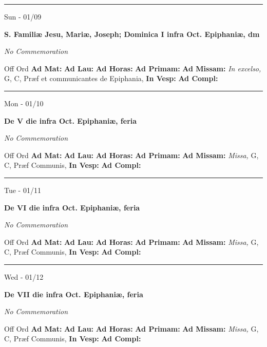 \documentclass[letterpaper, 10pt]{article}
\begin{document}
\hrule
\begin{center}
Sun - 01/09
\end{center}\textbf{ \large S. Familiæ Jesu, Mariæ, Joseph; Dominica I infra Oct. Epiphaniæ, \textnormal{\normalsize dm}}

\textit{No Commemoration}\begin{justify}
Off Ord
\textbf{Ad Mat: }
\textbf{Ad Lau: }
\textbf{Ad Horas: }
\textbf{Ad Primam: }
\textbf{Ad Missam:} \textit{In excelso, } G, C, Præf et communicantes de Epiphania, 
\textbf{In Vesp: }
\textbf{Ad Compl: }\end{justify}



\hrule
\begin{center}
Mon - 01/10
\end{center}\textbf{ \large De V die infra Oct. Epiphaniæ, \textnormal{\normalsize feria}}

\textit{No Commemoration}\begin{justify}
Off Ord
\textbf{Ad Mat: }
\textbf{Ad Lau: }
\textbf{Ad Horas: }
\textbf{Ad Primam: }
\textbf{Ad Missam:} \textit{Missa, } G, C, Præf Communis, 
\textbf{In Vesp: }
\textbf{Ad Compl: }\end{justify}



\hrule
\begin{center}
Tue - 01/11
\end{center}\textbf{ \large De VI die infra Oct. Epiphaniæ, \textnormal{\normalsize feria}}

\textit{No Commemoration}\begin{justify}
Off Ord
\textbf{Ad Mat: }
\textbf{Ad Lau: }
\textbf{Ad Horas: }
\textbf{Ad Primam: }
\textbf{Ad Missam:} \textit{Missa, } G, C, Præf Communis, 
\textbf{In Vesp: }
\textbf{Ad Compl: }\end{justify}



\hrule
\begin{center}
Wed - 01/12
\end{center}\textbf{ \large De VII die infra Oct. Epiphaniæ, \textnormal{\normalsize feria}}

\textit{No Commemoration}\begin{justify}
Off Ord
\textbf{Ad Mat: }
\textbf{Ad Lau: }
\textbf{Ad Horas: }
\textbf{Ad Primam: }
\textbf{Ad Missam:} \textit{Missa, } G, C, Præf Communis, 
\textbf{In Vesp: }
\textbf{Ad Compl: }\end{justify}
\end{document}
